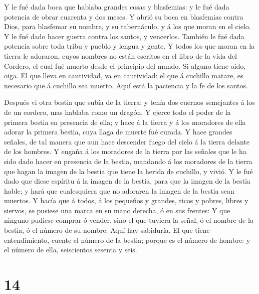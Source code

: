 Y le fué dada boca que hablaba grandes cosas y blasfemias:
y le fué dada potencia de obrar cuarenta y dos meses.  Y
abrió su boca en blasfemias contra Dios, para blasfemar su nombre, y su
tabernáculo, y á los que moran en el cielo.  Y le fué dado
hacer guerra contra los santos, y vencerlos. También le fué dada
potencia sobre toda tribu y pueblo y lengua y gente.  Y
todos los que moran en la tierra le adoraron, cuyos nombres no están
escritos en el libro de la vida del Cordero, el cual fué muerto desde el
principio del mundo.  Si alguno tiene oído, oiga.
 El que lleva en cautividad, va en cautividad: el que á
cuchillo matare, es necesario que á cuchillo sea muerto. Aquí está la
paciencia y la fe de los santos.

 Después vi otra bestia que subía de la tierra; y tenía dos
cuernos semejantes á los de un cordero, mas hablaba como un dragón.
 Y ejerce todo el poder de la primera bestia en presencia
de ella; y hace á la tierra y á los moradores de ella adorar la primera
bestia, cuya llaga de muerte fué curada.  Y hace grandes
señales, de tal manera que aun hace descender fuego del cielo á la
tierra delante de los hombres.  Y engaña á los moradores de
la tierra por las señales que le ha sido dado hacer en presencia de la
bestia, mandando á los moradores de la tierra que hagan la imagen de la
bestia que tiene la herida de cuchillo, y vivió.  Y le fué
dado que diese espíritu á la imagen de la bestia, para que la imagen de
la bestia hable; y hará que cualesquiera que no adoraren la imagen de la
bestia sean muertos.  Y hacía que á todos, á los pequeños y
grandes, ricos y pobres, libres y siervos, se pusiese una marca en su
mano derecha, ó en sus frentes:  Y que ninguno pudiese
comprar ó vender, sino el que tuviera la señal, ó el nombre de la
bestia, ó el número de su nombre.  Aquí hay sabiduría. El
que tiene entendimiento, cuente el número de la bestia; porque es el
número de hombre: y el número de ella, seiscientos sesenta y seis.

\hypertarget{section-13}{%
\section{14}\label{section-13}}

